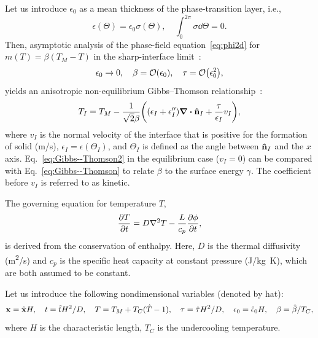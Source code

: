 \documentclass{article}
\begin{document}
Let us introduce $\epsilon_0$ as a mean thickness of the phase-transition layer, i.e.,
\begin{equation}\label{eq:epsilon}
    \epsilon(\Theta) = \epsilon_0\sigma(\Theta), \quad
    \int_0^{2\pi}\sigma\dd\Theta = 0.
\end{equation}
Then, asymptotic analysis of the phase-field equation~\eqref{eq:phi2d} for $m(T) = \beta(T_M-T)$
in the sharp-interface limit~\cite{caginalp1986analysis}:
\begin{equation}\label{eq:sil}
    \epsilon_0\to0, \quad \beta=\order{\epsilon_0}, \quad \tau=\order{\epsilon_0^2},
\end{equation}
yields an anisotropic non-equilibrium Gibbs--Thomson relationship~\cite{mcfadden1993phase}:
\begin{equation}\label{eq:Gibbs--Thomson2}
    T_I = T_M - \frac{1}{\sqrt2\beta} \qty(
        \qty(\epsilon_I + \epsilon_I'')\div\vu{n}_I
        + \frac{\tau}{\epsilon_I} v_I ),
\end{equation}
where $v_I$ is the normal velocity of the interface that is positive for the formation of solid (\si{m/s}),
$\epsilon_I=\epsilon(\Theta_I)$, and $\Theta_I$ is defined as the angle between $\vu{n}_I$ and the $x$ axis.
Eq.~\eqref{eq:Gibbs--Thomson2} in the equilibrium case ($v_I=0$) can be compared with Eq.~\eqref{eq:Gibbs--Thomson}
to relate $\beta$ to the surface energy $\gamma$. The coefficient before $v_I$ is referred to as kinetic.

The governing equation for temperature $T$,
\begin{equation}\label{eq:temperature}
    \pdv{T}{t} = D\laplacian{T} - \frac{L}{c_p}\pdv{\phi}{t},
\end{equation}
is derived from the conservation of enthalpy.
Here, $D$ is the thermal diffusivity (\si{m^2/s}) and
$c_p$ is the specific heat capacity at constant pressure (\si{J/kg.K}),
which are both assumed to be constant.

Let us introduce the following nondimensional variables (denoted by hat):
\begin{equation}\label{eq:dimensionless}
    \vb{x} = \hat{\vb{x}}H, \quad t = \hat{t}H^2/D, \quad
    T = T_M + T_C(\hat{T}-1), \quad \tau = \hat{\tau}H^2/D, \quad
    \epsilon_0 = \hat{\epsilon}_0H, \quad \beta = \hat{\beta}/T_C,
\end{equation}
where $H$ is the characteristic length, $T_C$ is the undercooling temperature.
\end{document}
